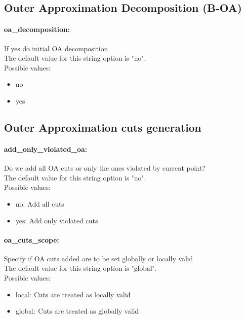 \subsection{Outer Approximation Decomposition (B-OA)}
\label{sec:OuterApproximationDecomposition(B-OA)}
\paragraph{oa\_decomposition:}\label{opt:oa_decomposition} If yes do initial OA decomposition \\
 The default value for this string option is "no".
\\ 
Possible values:
\begin{itemize}
   \item no
   \item yes
\end{itemize}

\subsection{Outer Approximation cuts generation}
\label{sec:OuterApproximationcutsgeneration}
\paragraph{add\_only\_violated\_oa:}\label{opt:add_only_violated_oa} Do we add all OA cuts or only the ones violated by current point? \\
 The default value for this string option is "no".
\\ 
Possible values:
\begin{itemize}
   \item no: Add all cuts
   \item yes: Add only violated cuts
\end{itemize}

\paragraph{oa\_cuts\_scope:}\label{opt:oa_cuts_scope} Specify if OA cuts added are to be set globally or locally valid \\
 The default value for this string option is "global".
\\ 
Possible values:
\begin{itemize}
   \item local: Cuts are treated as locally valid
   \item global: Cuts are treated as globally valid
\end{itemize}

